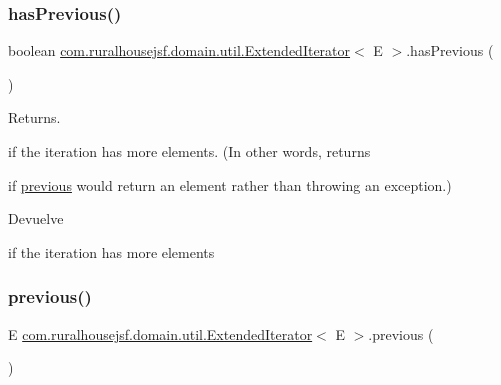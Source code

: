 \mbox{\label{a00192_a8aa41cc3f69db973663cf92a484579a9}} 
\subsubsection{\texorpdfstring{hasPrevious()}{hasPrevious()}}
{\footnotesize\ttfamily boolean \mbox{\hyperlink{a00192}{com.\+ruralhousejsf.\+domain.\+util.\+Extended\+Iterator}}$<$ E $>$.has\+Previous (\begin{DoxyParamCaption}{ }\end{DoxyParamCaption})}



Returns. 


\begin{DoxyCode}{0}
\DoxyCodeLine{\textcolor{keyword}{true} }
\end{DoxyCode}
 if the iteration has more elements. (In other words, returns
\begin{DoxyCode}{0}
\DoxyCodeLine{\textcolor{keyword}{true} }
\end{DoxyCode}
 if \mbox{\hyperlink{a00192_a4c9f9f5da6e96c08bc44d55517689397}{previous}} would return an element rather than throwing an exception.)

\begin{DoxyReturn}{Devuelve}

\begin{DoxyCode}{0}
\DoxyCodeLine{\textcolor{keyword}{true} }
\end{DoxyCode}
 if the iteration has more elements 
\end{DoxyReturn}
\mbox{\label{a00192_a4c9f9f5da6e96c08bc44d55517689397}} 
\subsubsection{\texorpdfstring{previous()}{previous()}}
{\footnotesize\ttfamily E \mbox{\hyperlink{a00192}{com.\+ruralhousejsf.\+domain.\+util.\+Extended\+Iterator}}$<$ E $>$.previous (\begin{DoxyParamCaption}{ }\end{DoxyParamCaption})}



